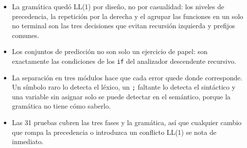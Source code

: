 \documentclass[12pt,letterpaper]{article}
\newcommand{\tk}[1]{\texttt{#1}}
\begin{document}
\begin{itemize}
  \item La gramática quedó LL(1) por diseño, no por casualidad: los niveles de precedencia, la repetición por la derecha y el agrupar las funciones en un solo no terminal son las tres decisiones que evitan recursión izquierda y prefijos comunes.
  \item Los conjuntos de predicción no son solo un ejercicio de papel: son exactamente las condiciones de los \tk{if} del analizador descendente recursivo.
  \item La separación en tres módulos hace que cada error quede donde corresponde. Un símbolo raro lo detecta el léxico, un \tk{;} faltante lo detecta el sintáctico y una variable sin asignar solo se puede detectar en el semántico, porque la gramática no tiene cómo saberlo.
  \item Las 31 pruebas cubren las tres fases y la gramática, así que cualquier cambio que rompa la precedencia o introduzca un conflicto LL(1) se nota de inmediato.
\end{itemize}
\end{document}
